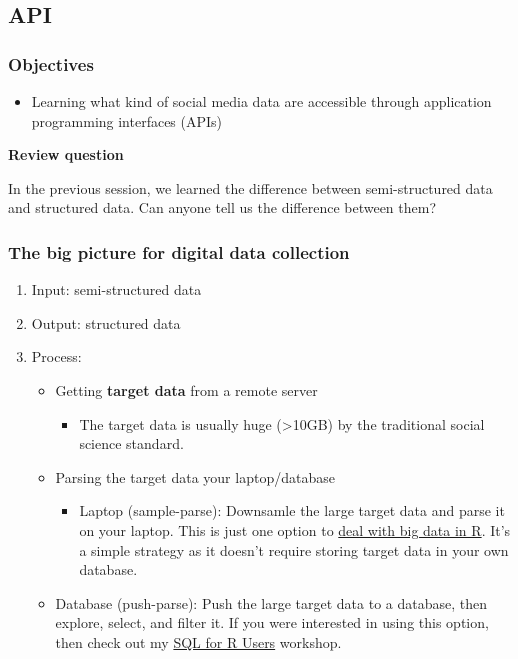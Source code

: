 \documentclass[
]{book}
\providecommand{\tightlist}{%
  \setlength{\itemsep}{0pt}\setlength{\parskip}{0pt}}
\begin{document}
\hypertarget{api}{%
\subsection{API}\label{api}}

\hypertarget{objectives-4}{%
\subsubsection{Objectives}\label{objectives-4}}

\begin{itemize}
\tightlist
\item
  Learning what kind of social media data are accessible through application programming interfaces (APIs)
\end{itemize}

\textbf{Review question}

In the previous session, we learned the difference between semi-structured data and structured data. Can anyone tell us the difference between them?

\hypertarget{the-big-picture-for-digital-data-collection}{%
\subsubsection{The big picture for digital data collection}\label{the-big-picture-for-digital-data-collection}}

\begin{enumerate}
\def\labelenumi{\arabic{enumi}.}
\item
  Input: semi-structured data
\item
  Output: structured data
\item
  Process:

  \begin{itemize}
  \item
    Getting \textbf{target data} from a remote server

    \begin{itemize}
    \tightlist
    \item
      The target data is usually huge (\textgreater10GB) by the traditional social science standard.
    \end{itemize}
  \item
    Parsing the target data your laptop/database

    \begin{itemize}
    \tightlist
    \item
      Laptop (sample-parse): Downsamle the large target data and parse it on your laptop. This is just one option to \href{https://rviews.rstudio.com/2019/07/17/3-big-data-strategies-for-r/}{deal with big data in R}. It's a simple strategy as it doesn't require storing target data in your own database.
    \end{itemize}
  \item
    Database (push-parse): Push the large target data to a database, then explore, select, and filter it. If you were interested in using this option, then check out my \href{https://github.com/dlab-berkeley/sql-for-r-users}{SQL for R Users} workshop.
  \end{itemize}
\end{enumerate}
\end{document}
